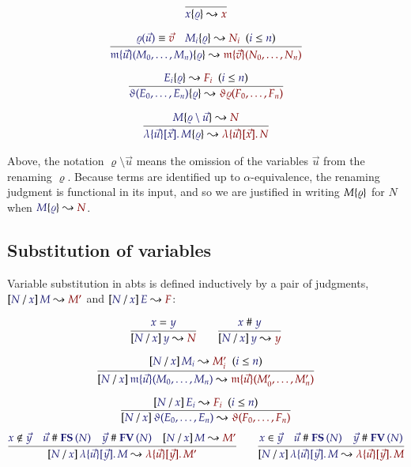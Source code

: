 \documentclass[11pt]{article}
\theoremstyle{definition}
\theoremstyle{remark}
\numberwithin{equation}{section}
\begin{document}
\begin{gather*}
  \infer{
    \IsRenaming{\varrho}{x}{x}
  }{
  }
\\[6pt]
  \infer{
    \IsRenaming{\varrho}{
      \MApp{\MV{m}}{\vec{u}}{M_0,\dots,M_n}
    }{
      \MApp{\MV{m}}{\vec{v}}{N_0,\dots,N_n}
    }
  }{
    \Match{\varrho(\vec{u})}{\vec{v}}
&
    \HypJ{
      \IsRenaming{\varrho}{M_i}{N_i}
    }{
      \Leq{i}{n}
    }
  }
\\[6pt]
  \infer{
    \IsRenaming{\varrho}{
      \App{\vartheta}{E_0,\dots,E_n}
    }{
      \App{\vartheta\varrho}{F_0,\dots,F_n}
    }
  }{
    \HypJ{
      \IsRenaming{\varrho}{E_i}{F_i}
    }{
      \Leq{i}{n}
    }
  }
\\[6pt]
  \infer{
    \IsRenaming{\varrho}{
      \MkBTm{\vec{u}}{\vec{x}}{M}
    }{
      \MkBTm{\vec{u}}{\vec{x}}{N}
    }
  }{
    \IsRenaming{\varrho\setminus\vec{u}}{M}{N}
  }
\end{gather*}

Above, the notation $\varrho\setminus\vec{u}$ means the omission of the
variables $\vec{u}$ from the renaming $\varrho$. Because terms are identified up
to $\alpha$-equivalence, the renaming judgment is functional in its input, and
so we are justified in writing $M\{\varrho\}$ for $N$ when
$\IsRenaming{\varrho}{M}{N}$.

\subsection{Substitution of variables}

Variable substitution in abts is defined inductively by a pair of judgments,
$\IsSubst{N}{x}{M}{M'}$ and $\IsSubst{N}{x}{E}{F}$:

\begin{gather*}
  \infer{
    \IsSubst{N}{x}{y}{N}
  }{
    \IsEq{x}{y}
  }
\qquad
  \infer{
    \IsSubst{N}{x}{y}{y}
  }{
    \IsApart{x}{y}
  }
\\[6pt]
  \infer{
    \IsSubst{N}{x}{
      \MApp{\MV{m}}{\vec{u}}{M_0,\dots,M_n}
    }{
      \MApp{\MV{m}}{\vec{u}}{M'_0,\dots,M'_n}
    }
  }{
    \HypJ{
      \IsSubst{N}{x}{M_i}{M'_i}
    }{
      \Leq{i}{n}
    }
  }
\\[6pt]
  \infer{
    \IsSubst{N}{x}{
      \App{\vartheta}{E_0,\dots,E_n}
    }{
      \App{\vartheta}{F_0,\dots,F_n}
    }
  }{
    \HypJ{
      \IsSubst{N}{x}{E_i}{F_i}
    }{
      \Leq{i}{n}
    }
  }
\end{gather*}
\begin{gather*}
  \infer{
    \IsSubst{N}{x}{
      \MkBTm{\vec{u}}{\vec{y}}{M}
    }{
      \MkBTm{\vec{u}}{\vec{y}}{M'}
    }
  }{
    \NotIn{x}{\vec{y}}
&
    \IsApart{\vec{u}}{\FS{N}}
&
    \IsApart{\vec{y}}{\FV{N}}
&
    \IsSubst{N}{x}{M}{M'}
  }
\qquad
  \infer{
    \IsSubst{N}{x}{
      \MkBTm{\vec{u}}{\vec{y}}{M}
    }{
      \MkBTm{\vec{u}}{\vec{y}}{M}
    }
  }{
    \Member{x}{\vec{y}}
&
    \IsApart{\vec{u}}{\FS{N}}
&
    \IsApart{\vec{y}}{\FV{N}}
  }
\end{gather*}
\end{document}
